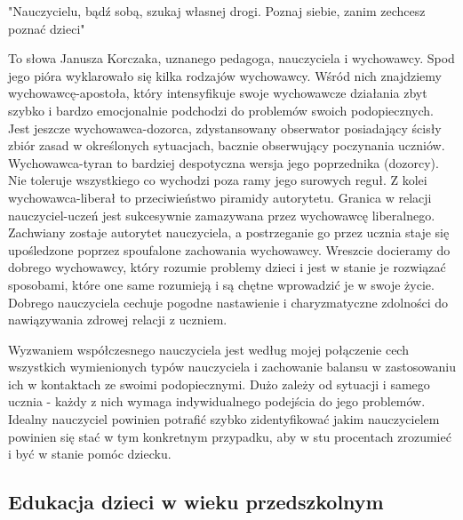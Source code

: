 \documentclass{article}
\begin{document}
"Nauczycielu, bądź sobą,
szukaj własnej drogi.
Poznaj siebie, zanim zechcesz
poznać dzieci"
\par
To słowa\cite{ref2} Janusza Korczaka, uznanego pedagoga, nauczyciela i wychowawcy. Spod jego pióra wyklarowało się kilka rodzajów wychowawcy. Wśród nich znajdziemy wychowawcę-apostoła, który intensyfikuje swoje wychowawcze działania zbyt szybko i bardzo emocjonalnie podchodzi do problemów swoich podopiecznych. Jest jeszcze wychowawca-dozorca, zdystansowany obserwator posiadający ścisły zbiór zasad w określonych sytuacjach, bacznie obserwujący poczynania uczniów. Wychowawca-tyran to bardziej despotyczna wersja jego poprzednika (dozorcy). Nie toleruje wszystkiego co wychodzi poza ramy jego surowych reguł. Z kolei wychowawca-liberał to przeciwieństwo piramidy autorytetu. Granica w relacji nauczyciel-uczeń jest sukcesywnie zamazywana przez wychowawcę liberalnego. Zachwiany zostaje autorytet nauczyciela, a postrzeganie go przez ucznia staje się upośledzone poprzez spoufalone zachowania wychowawcy. Wreszcie docieramy do dobrego wychowawcy, który rozumie problemy dzieci i jest w stanie je rozwiązać sposobami, które one same rozumieją i są chętne wprowadzić je w swoje życie. Dobrego nauczyciela cechuje pogodne nastawienie i charyzmatyczne zdolności do nawiązywania zdrowej relacji z uczniem.
\par
Wyzwaniem współczesnego nauczyciela jest według mojej połączenie cech wszystkich wymienionych typów nauczyciela i zachowanie balansu w zastosowaniu ich w kontaktach ze swoimi podopiecznymi. Dużo zależy od sytuacji i samego ucznia - każdy z nich wymaga indywidualnego podejścia do jego problemów. Idealny nauczyciel powinien potrafić szybko zidentyfikować jakim nauczycielem powinien się stać w tym konkretnym przypadku, aby w stu procentach zrozumieć i być w stanie pomóc dziecku.

\subsection{Edukacja dzieci w wieku przedszkolnym}
\end{document}
